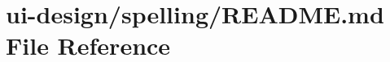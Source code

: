 \hypertarget{spelling_2README_8md}{}\section{ui-\/design/spelling/\+R\+E\+A\+D\+ME.md File Reference}
\label{spelling_2README_8md}
